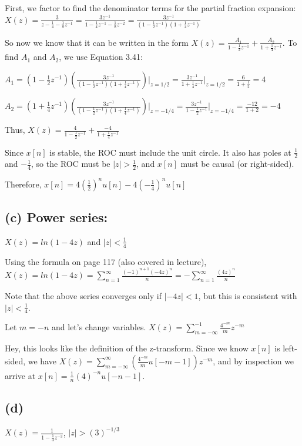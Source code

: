 \documentclass[11pt]{article}
\begin{document}
First, we factor to find the denominator terms for the partial fraction expansion:
$X(z) = \frac{3}{z-\frac{1}{4}-\frac{1}{8}z^{-1}} = \frac{3z^{-1}}{1-\frac{1}{4}z^{-1}-\frac{1}{8}z^{-2}} = \frac{3z^{-1}}{(1-\frac{1}{2}z^{-1})(1+\frac{1}{4}z^{-1})}$

So now we know that it can be written in the form $X(z) = \frac{A_1}{1-\frac{1}{2}z^{-1}}+\frac{A_2}{1+\frac{1}{4}z^{-1}}$. To find $A_1$ and $A_2$, we use Equation 3.41:

$A_1 = (1-\frac{1}{2}z^{-1})\left(\frac{3z^{-1}}{(1-\frac{1}{2}z^{-1})(1+\frac{1}{4}z^{-1})}\right)\bigg|_{z=1/2}=\frac{3z^{-1}}{1+\frac{1}{4}z^{-1}}\bigg|_{z=1/2} = \frac{6}{1+\frac{1}{2}} = 4$

$A_2 = (1+\frac{1}{4}z^{-1})\left(\frac{3z^{-1}}{(1-\frac{1}{2}z^{-1})(1+\frac{1}{4}z^{-1})}\right)\bigg|_{z=-1/4} = \frac{3z^{-1}}{1-\frac{1}{2}z^{-1}}\bigg|_{z=-1/4} = \frac{-12}{1+2} = -4$

Thus, $X(z) = \frac{4}{1-\frac{1}{2}z^{-1}}+\frac{-4}{1+\frac{1}{4}z^{-1}}$

Since $x[n]$ is stable, the ROC must include the unit circle. It also has poles at $\frac{1}{2}$ and $-\frac{1}{4}$, so the ROC must be $|z|>\frac{1}{2}$, and $x[n]$ must be causal (or right-sided).

Therefore, $x[n]=4\left(\frac{1}{2}\right)^nu[n]-4\left(-\frac{1}{4}\right)^n u[n]$ 


\subsection*{(c) Power series:}
$X(z) = ln(1-4z)$ and $|z|<\frac{1}{4}$

Using the formula on page 117 (also covered in lecture), $X(z) = ln(1-4z) = \sum\limits_{n=1}^\infty \frac{(-1)^{n+1}(-4z)^n}{n} = - \sum\limits_{n=1}^\infty \frac{(4z)^n}{n}$ 

Note that the above series converges only if $|-4z|<1$, but this is consistent with $|z|<\frac{1}{4}$.

Let $m=-n$ and let's change variables. $X(z) = \sum\limits_{m=-\infty}^{-1}\frac{4^{-m}}{m}z^{-m}$ 

Hey, this looks like the definition of the z-transform. Since we know $x[n]$ is left-sided, we have $X(z) = \sum\limits_{m=-\infty}^{\infty}\left(\frac{4^{-m}}{m}u[-m-1]\right)z^{-m}$, and by inspection we arrive at $x[n]=\frac{1}{n}(4)^{-n}u[-n-1]$.


\subsection*{(d)}
$X(z) = \frac{1}{1-\frac{1}{3}z^{-3}}$, $|z|>(3)^{-1/3}$
\end{document}
